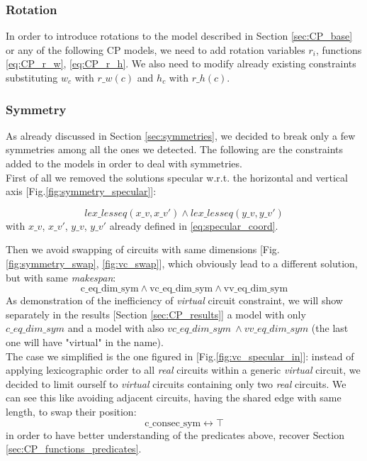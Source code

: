 \subsubsection{Rotation} \label{sec:CP_rotation}

In order to introduce rotations to the model described in Section \ref{sec:CP_base} or any
of the following CP models, we need to add rotation variables $r_i$, functions \ref{eq:CP_r_w}, \ref{eq:CP_r_h}. We
also need to modify already existing constraints substituting $w_c$ with $r\_w(c)$ and $h_c$ with $r\_h(c)$.

\subsubsection{Symmetry} \label{sec:CP_symmetry}

As already discussed in Section \ref{sec:symmetries}, we decided to break only a few symmetries among all the ones we
detected. The following are the constraints added to the models in order to deal with symmetries.\\

First of all we removed the solutions specular w.r.t. the horizontal and vertical axis [Fig.\ref{fig:symmetry_specular}]:

\begin{equation*}
  lex\_lesseq(x\_v, x\_v') \land lex\_lesseq(y\_v, y\_v')
\end{equation*}
with $x\_v$, $x\_v'$, $y\_v$, $y\_v'$ already defined in \ref{eq:specular_coord}.

Then we avoid swapping of circuits with same dimensions [Fig.\ref{fig:symmetry_swap}, \ref{fig:vc_swap}],
which obviously lead to a different solution, but with same \textit{makespan}:
\begin{equation*}
  \text{c\_eq\_dim\_sym} \land \text{vc\_eq\_dim\_sym} \land \text{vv\_eq\_dim\_sym}
\end{equation*}
As demonstration of the inefficiency of \textit{virtual} circuit constraint, we will show 
separately in the results [Section \ref{sec:CP_results}] a model with only \(c\_eq\_dim\_sym\)
and a model with also \(vc\_eq\_dim\_sym\ \land vv\_eq\_dim\_sym\) (the last one will have "virtual" in the name).\\

The case we simplified is the one figured in [Fig.\ref{fig:vc_specular_in}]: instead of applying
lexicographic order to all \textit{real} circuits within a generic \textit{virtual} circuit, we
decided to limit ourself to \textit{virtual} circuits containing only two \textit{real} circuits.
We can see this like avoiding adjacent circuits, having the shared edge with same length,
to swap their position:
\begin{equation*}
  \text{c\_consec\_sym} \leftrightarrow \top
\end{equation*}
in order to have better understanding of the predicates above, recover Section \ref{sec:CP_functions_predicates}.

